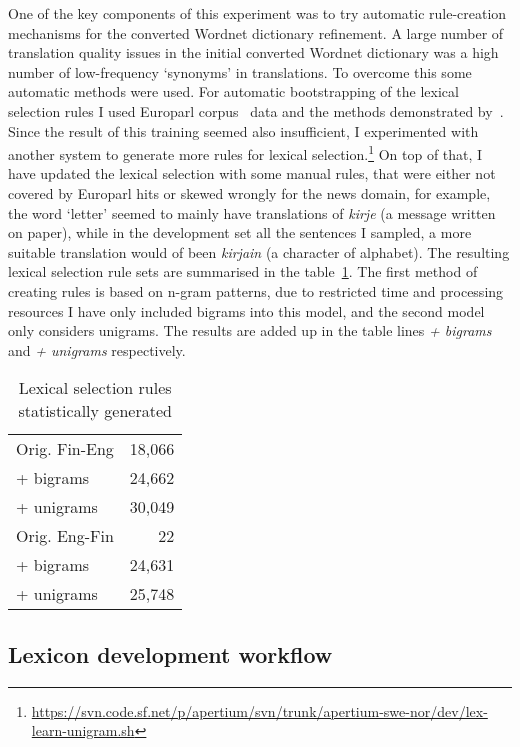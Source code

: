 \documentclass[11pt,a4paper]{article}
\begin{document}
One of the key components of this experiment was to try automatic rule-creation
mechanisms for the converted Wordnet dictionary refinement.  A large number of
translation quality issues in the initial converted Wordnet dictionary was a
high number of low-frequency `synonyms' in translations. To overcome this some
automatic methods were used. For automatic bootstrapping of the lexical
selection rules I used Europarl corpus~\cite{koehn2005europarl} data and the
methods demonstrated by~\citet{tyers2012flexible}.  Since the result of this
training seemed also insufficient, I experimented with another system to
generate more rules for lexical
selection.\footnote{\url{https://svn.code.sf.net/p/apertium/svn/trunk/apertium-swe-nor/dev/lex-learn-unigram.sh}}
On top of that, I have updated the lexical selection with some manual rules,
that were either not covered by Europarl hits or skewed wrongly for the news
domain, for example, the word `letter' seemed to mainly have translations of
\textit{kirje} (a message written on paper), while in the development set all
the sentences I sampled, a more suitable translation would of been
\textit{kirjain} (a character of alphabet).  The resulting lexical selection
rule sets are summarised in the table~\ref{table:lexical-selection}. The first
method of creating rules is based on n-gram patterns, due to restricted time and
processing resources I have only included bigrams into this model, and the
second model only considers unigrams.  The results are added up in the table
lines \textit{+ bigrams} and \textit{+ unigrams} respectively.

\begin{table}
\begin{center}
    \begin{tabular}{lr}
        \toprule
        Orig. Fin-Eng & 18,066 \\
        + bigrams &     24,662\\
        + unigrams &    30,049 \\
        \midrule
        Orig. Eng-Fin & 22 \\
        + bigrams & 24,631 \\
        + unigrams & 25,748 \\
        \bottomrule
    \end{tabular}
    \caption{Lexical selection rules statistically generated\label{table:lexical-selection}}
\end{center}
\end{table}


\subsection{Lexicon development workflow}
\label{sec:lexicon-development}
\end{document}
